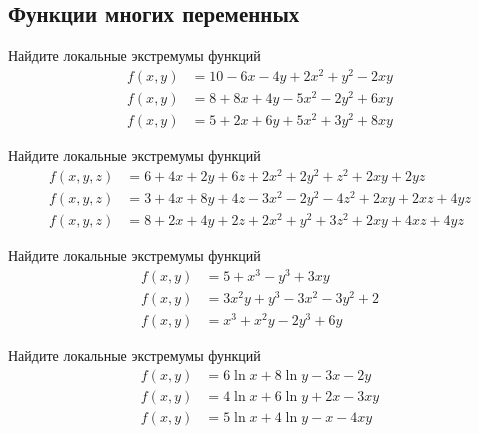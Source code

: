 \subsection{Функции многих переменных}

\begin{exercise}
Найдите локальные экстремумы функций
\begin{align*}
	f(x,y) &= 10-6x-4y+2x^2+y^2-2xy \\
	f(x,y) &= 8+8x+4y-5x^2-2y^2+6xy \\
	f(x,y) &= 5+2x+6y+5x^2+3y^2+8xy
\end{align*}
\end{exercise}

\begin{exercise}
Найдите локальные экстремумы функций
\begin{align*}
	f(x,y,z) &= 6+4x+2y+6z+2x^2+2y^2+z^2+2xy+2yz \\
	f(x,y,z) &= 3+4x+8y+4z-3x^2-2y^2-4z^2+2xy+2xz+4yz\\
	f(x,y,z) &= 8+2x+4y+2z+2x^2+y^2+3z^2+2xy+4xz+4yz
\end{align*}
\end{exercise}
	
\begin{exercise}
Найдите локальные экстремумы функций
\begin{align*}
	f(x,y) &= 5+x^3-y^3+3xy \\
	f(x,y) &= 3x^2y+y^3-3x^2-3y^2+2 \\
	f(x,y) &= x^3+x^2y-2y^3+6y
\end{align*}
\end{exercise}

\begin{exercise}
Найдите локальные экстремумы функций
\begin{align*}
	f(x,y) &= 6\ln x+8\ln y-3x-2y \\
	f(x,y) &= 4\ln x+6\ln y+2x-3xy \\
	f(x,y) &= 5\ln x+4\ln y-x-4xy
\end{align*}
\end{exercise}